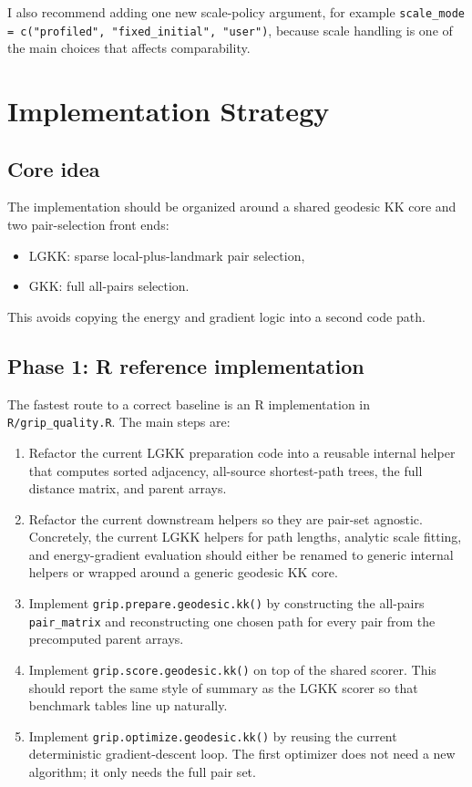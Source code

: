 \documentclass[11pt]{article}
\begin{document}
I also recommend adding one new scale-policy argument, for example
\texttt{scale\_mode = c("profiled", "fixed\_initial", "user")}, because scale
handling is one of the main choices that affects comparability.

\section{Implementation Strategy}

\subsection{Core idea}

The implementation should be organized around a shared geodesic KK core and two
pair-selection front ends:
\begin{itemize}[leftmargin=1.5em]
\item LGKK: sparse local-plus-landmark pair selection,
\item GKK: full all-pairs selection.
\end{itemize}

This avoids copying the energy and gradient logic into a second code path.

\subsection{Phase 1: R reference implementation}

The fastest route to a correct baseline is an R implementation in
\texttt{R/grip\_quality.R}. The main steps are:

\begin{enumerate}[leftmargin=1.5em]
\item Refactor the current LGKK preparation code into a reusable internal helper
that computes sorted adjacency, all-source shortest-path trees, the full
distance matrix, and parent arrays.

\item Refactor the current downstream helpers so they are pair-set agnostic.
Concretely, the current LGKK helpers for path lengths, analytic scale fitting,
and energy-gradient evaluation should either be renamed to generic internal
helpers or wrapped around a generic geodesic KK core.

\item Implement \texttt{grip.prepare.geodesic.kk()} by constructing the all-pairs
\texttt{pair\_matrix} and reconstructing one chosen path for every pair from the
precomputed parent arrays.

\item Implement \texttt{grip.score.geodesic.kk()} on top of the shared scorer.
This should report the same style of summary as the LGKK scorer so that
benchmark tables line up naturally.

\item Implement \texttt{grip.optimize.geodesic.kk()} by reusing the current
deterministic gradient-descent loop. The first optimizer does not need a new
algorithm; it only needs the full pair set.
\end{enumerate}
\end{document}
